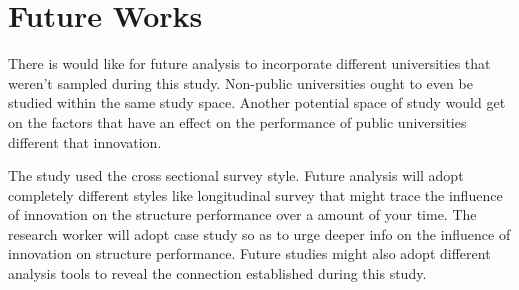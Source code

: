 \section{\textbf{Future Works}}
There is would like for future analysis to incorporate different universities that weren't sampled during this study. Non-public universities ought to even be studied within the same study space. Another potential space of study would get on the factors that have an effect on the performance of public universities different that innovation.

The study used the cross sectional survey style. Future analysis will adopt completely different styles like longitudinal survey that might trace the influence of innovation on the structure performance over a amount of your time. The research worker will adopt case study so as to urge deeper info on the influence of innovation on structure performance. Future studies might also adopt different analysis tools to reveal the connection established during this study.

